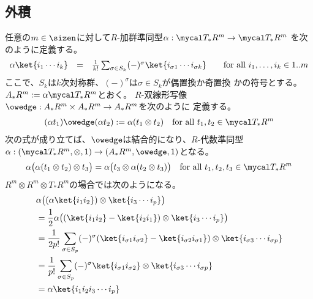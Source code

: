 {\subsection{外積}\label{s2:外積} %
	任意の$m\in\sizen$に対して$R$-加群準同型$\alpha:\T_*R^m\to\T_*R^m$
	を次のように定義する。
	\begin{equation*}\begin{array}{rcll}
		\alpha \ket{i_1\cdots i_k}
			&=& \frac{1}{k!}\sum_{\sigma\in S_k} (-)^\sigma 
			\ket{i_{\sigma1}\cdots i_{\sigma k}}
			& \quad\text{for all } i_1,\dots,i_k\in 1..m
	\end{array}\end{equation*}
	ここで、$S_k$は$k$次対称群、$(-)^\sigma$は$\sigma\in S_k$が偶置換か奇置換
	かの符号とする。$A_*R^m:=\alpha\T_*R^m$とおく。
	$R$-双線形写像$\owedge:A_*R^m\times A_*R^m\to A_*R^m$を次のように
	定義する。
	\begin{equation*}\begin{split}
		(\alpha t_1)\owedge(\alpha t_2) := \alpha(t_1\otimes t_2)
		\quad\text{for all } t_1,t_2\in \T_*R^m
	\end{split}\end{equation*}
	次の式が成り立てば、$\owedge$は結合的になり、$R$-代数準同型
	$\alpha:(\T_*R^m,\otimes,1)\to (A_*R^m,\owedge,1)$となる。
	\begin{equation}\label{eq:交代化が積になるための条件}\begin{split}
		\alpha\bigl(\alpha(t_1\otimes t_2)\otimes t_3\bigr)
		= \alpha\bigl(t_3\otimes \alpha(t_2\otimes t_3)\bigr)
		\quad\text{for all } t_1,t_2,t_3\in\T_*R^m
	\end{split}\end{equation}
	$R^m\otimes R^m\otimes T_*R^m$の場合では次のようになる。
	\begin{equation*}\begin{split}
		& \alpha\bigl((\alpha\ket{i_1i_2})\otimes\ket{i_3\cdots i_p}\bigr) \\
		& = \frac{1}{2}\alpha\bigl((\ket{i_1i_2}-\ket{i_2i_1})
			\otimes\ket{i_3\cdots i_p}\bigr) \\
		& = \frac{1}{2p!} \sum_{\sigma\in S_p} (-)^\sigma
			(\ket{i_{\sigma1}i_{\sigma2}} - \ket{i_{\sigma2}i_{\sigma1}})
			\otimes\ket{i_{\sigma3}\cdots i_{\sigma p}} \\
		& = \frac{1}{p!} \sum_{\sigma\in S_p} (-)^\sigma
			\ket{i_{\sigma1}i_{\sigma2}}
			\otimes\ket{i_{\sigma3}\cdots i_{\sigma p}} \\
		& = \alpha\ket{i_1i_2i_3\cdots i_p} \\

\end{split}
\end{equation*}}
